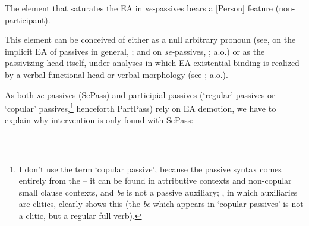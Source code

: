 \documentclass[output=paper]{langsci/langscibook}
\begin{document}
\ea%
    \label{ex:giurgea:26}
    The element that saturates the EA in \textit{se-}passives bears a [Person] feature (non-participant).
\z

This element can be conceived of either as a null arbitrary pronoun (see, on the implicit EA of passives in general, \citealt{Collins2005,Landau2010Explicit}; and on  \textit{se-}passives, \citealt{MacDonald2017}; a.o.) or as the passivizing head itself, under analyses in which EA existential binding is realized by a verbal functional head or verbal morphology (see \citealt{Baker1989Passive,Bruening2012}; a.o.).

As both \textit{se-}passives (SePass) and participial passives (‘regular' passives or ‘copular' passives,\footnote{I don’t use the term ‘copular passive', because the passive syntax comes entirely from the  – it can be found in attributive contexts and non-copular small clause contexts, and \textit{be} is not a passive auxiliary; , in which auxiliaries are clitics, clearly shows this (the \textit{be} which appears in ‘copular passives' is not a clitic, but a regular full verb).} henceforth PartPass) rely on EA demotion, we have to explain why intervention is only found with SePass:

\ea%
    \label{ex:giurgea:27}\\
    \z
\z
\end{document}
